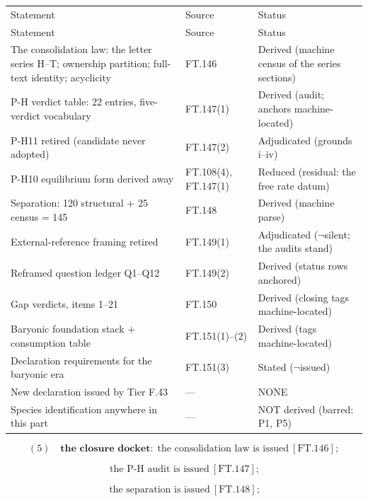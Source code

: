 \documentclass[11pt,openany]{report}
\theoremstyle{canonplain}
\theoremstyle{canondef}
\begin{document}
{\scriptsize\setlength{\tabcolsep}{4pt}
\begin{longtable}{>{\raggedright\arraybackslash}p{}|>{\raggedright\arraybackslash}p{}|>{\raggedright\arraybackslash}p{}}
\toprule
Statement & Source & Status \\
\addlinespace[2pt]
\midrule
\endfirsthead
\toprule
Statement & Source & Status \\
\addlinespace[2pt]
\midrule
\endhead
\bottomrule
\endlastfoot
The consolidation law: the letter series H–T; ownership partition; full-text identity; acyclicity & FT.146 & Derived (machine census of the series sections) \\
P-H verdict table: 22 entries, five-verdict vocabulary & FT.147(1) & Derived (audit; anchors machine-located) \\
P-H11 retired (candidate never adopted) & FT.147(2) & Adjudicated (grounds i–iv) \\
P-H10 equilibrium form derived away & FT.108(4), FT.147(1) & Reduced (residual: the free rate datum) \\
Separation: 120 structural + 25 census = 145 & FT.148 & Derived (machine parse) \\
External-reference framing retired & FT.149(1) & Adjudicated ($\neg$silent; the audits stand) \\
Reframed question ledger Q1–Q12 & FT.149(2) & Derived (status rows anchored) \\
Gap verdicts, items 1–21 & FT.150 & Derived (closing tags machine-located) \\
Baryonic foundation stack + consumption table & FT.151(1)–(2) & Derived (tags machine-located) \\
Declaration requirements for the baryonic era & FT.151(3) & Stated ($\neg$issued) \\
New declaration issued by Tier F.43 & — & NONE \\
Species identification anywhere in this part & — & NOT derived (barred: P1, P5) \\
\end{longtable}
}

\[
(5)\quad\textbf{the closure docket:}\ \ \text{the consolidation law is issued}\ [\mathrm{FT.146}];
\]

\[
\ \text{the P-H audit is issued}\ [\mathrm{FT.147}];
\]

\[
\ \text{the separation is issued}\ [\mathrm{FT.148}];
\]
\end{document}
